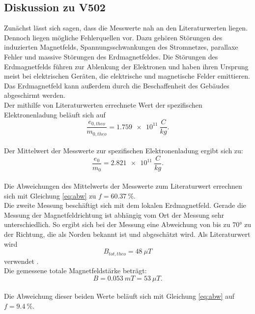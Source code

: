 \FloatBarrier
\subsection{Diskussion zu V502}
Zunächst lässt sich sagen, dass die Messwerte nah an den Literaturwerten liegen.
Dennoch liegen mögliche Fehlerquellen vor.
Dazu gehören Störungen des induzierten Magnetfelds, Spannungsschwankungen des Stromnetzes, parallaxe Fehler und massive Störungen des Erdmagnetfeldes.
Die Störungen des Erdmagnetfelds führen zur Ablenkung der Elektronen und haben ihren Ursprung meist bei elektrischen Geräten, die elektrische und magnetische Felder emittieren.
Das Erdmagnetfeld kann außerdem durch die Beschaffenheit des Gebäudes abgeschirmt werden.
\\Der mithilfe von Literaturwerten \cite{taschenrechner} errechnete Wert der spezifischen Elektronenladung beläuft sich auf
\begin{equation*}
  \frac{e_{0, theo}}{m_{0, theo}}= \SI{1,759e11}{\frac{C}{kg}}.
\end{equation*}
\\Der Mittelwert der Messwerte zur spezifischen Elektronenladung ergibt sich zu:
\begin{equation*}
  \frac{e_{0}}{m_{0}}= \SI{2,821e11}{\frac{C}{kg}}.
\end{equation*}
\\Die Abweichungen des Mittelwerts der Messwerte zum Literaturwert errechnen sich mit Gleichung \eqref{eq:abw} zu $f=\SI{60,37}{\%}$.
\\Die zweite Messung beschäftigt sich mit dem lokalen Erdmagnetfeld.
Gerade die Messung der Magnetfeldrichtung ist abhängig vom Ort der Messung sehr unterschiedlich.
So ergibt sich bei der Messung eine Abweichung von bis zu $70°$ zu der Richtung, die als Norden bekannt ist und abgeschätzt wird.
Als Literaturwert wird
\begin{equation*}
    B_{tot, theo}=\SI{48}{\mu T}
\end{equation*}
verwendet \cite{4}.
\\Die gemessene totale Magnetfeldstärke beträgt:
\begin{equation*}
  B = \SI{0,053}{mT}=\SI{53}{\mu T}.
\end{equation*}
\\Die Abweichung dieser beiden Werte beläuft sich mit Gleichung \eqref{eq:abw} auf $f=\SI{9,4}{\%}$.
\FloatBarrier
